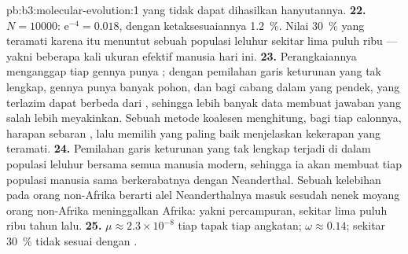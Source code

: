 \begin{solution}{pb:b3:molecular-evolution:1}
yang tidak dapat dihasilkan hanyutannya.
\textbf{22.} $N = \num{10000}$: $\mathrm{e}^{-4} = 0.018$, dengan ketaksesuaiannya
\qty{1.2}{\%}. Nilai \qty{30}{\%} yang teramati karena itu menuntut sebuah populasi
leluhur sekitar lima puluh ribu --- yakni beberapa kali ukuran efektif
manusia hari ini.
\textbf{23.} Perangkaiannya menganggap tiap gennya punya ; dengan
pemilahan garis keturunan yang tak lengkap, gennya punya banyak pohon, dan bagi cabang
dalam yang pendek,  yang terlazim dapat berbeda dari , sehingga lebih banyak data membuat jawaban yang salah lebih meyakinkan. Sebuah metode
koalesen menghitung, bagi tiap  calonnya, harapan
sebaran , lalu memilih  yang paling baik
menjelaskan kekerapan yang teramati.
\textbf{24.} Pemilahan garis keturunan yang tak lengkap terjadi di dalam populasi leluhur
bersama semua manusia modern, sehingga ia akan membuat tiap populasi
manusia sama berkerabatnya dengan Neanderthal. Sebuah kelebihan pada orang non-Afrika
berarti alel Neanderthalnya masuk sesudah nenek moyang orang non-Afrika
meninggalkan Afrika: yakni percampuran, sekitar lima puluh ribu tahun lalu.
\textbf{25.} $\mu \approx 2.3\times 10^{-8}$ tiap tapak tiap angkatan;
$\omega \approx 0.14$; sekitar \qty{30}{\%}  tidak sesuai dengan
.
\end{solution}
